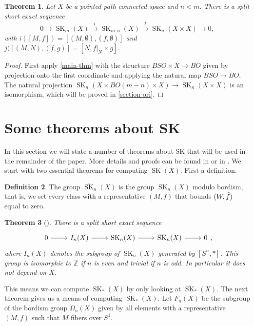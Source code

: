 \documentclass{amsart}
\newtheorem{thm}{Theorem}[section]
\theoremstyle{definition}
\newtheorem{defi}[thm]{Definition}
\theoremstyle{remark}
\newcommand{\Z}{\mathbb{Z}}
\newcommand{\SK}{\operatorname{SK}}
\newcommand{\bSK}{\overline{\SK}}
\begin{document}
\begin{thm}
    \label{komiya-ori}
    Let $X$ be a pointed path connected space and $n<m$. There is a split short exact sequence
    \[0 \longrightarrow \SK_m(X) \xrightarrow{i} \SK_{m,n}(X) \xrightarrow{j}  \SK_n(X\times X) \longrightarrow 0,\]
    with $i([M,f]) = [(M,\emptyset), (f, \emptyset)]$ and $j([(M,N), (f,g)] = [N, f|_N\times g]$.
\end{thm}
\begin{proof}
    First apply \cref{main-thm} with the structure $BSO\times X \to BO$ given by projection onto the first coordinate and applying the natural map $BSO\to BO$. The natural projection $\SK_n(X\times BO(m-n) \times X) \to \SK_n(X\times X)$ is an isomorphism, which will be proved in \cref{section-ori}.
\end{proof}

\section{Some theorems about SK}

In this section we will state a number of theorems about SK that will be used in the remainder of the paper. More details and proofs can be found in \cite{skbook} or in \cite{neumann1975}. We start with two essential theorems for computing $\SK(X)$. First a definition.

\begin{defi}
    The group $\bSK_n(X)$ is the group $\SK_n(X)$ modulo bordism, that is, we set every class with a representative $(M,f)$ that bounds $(W,\Tilde{f})$ equal to zero.
\end{defi}

\begin{thm}[{\cite[Theorem 1.1]{skbook}}]
\label{skbook1.1}
    There is a split short exact sequence
    \[\begin{tikzcd}
    0 \arrow[r] & I_n(X) \arrow[r] & \SK_n(X) \arrow[r] & \bSK_n(X) \arrow[r] & 0
    \end{tikzcd},\]
    where $I_n(X)$ denotes the subgroup of $\SK_n(X)$ generated by $[S^n, *]$. This group is isomorphic to $\Z$ if $n$ is even and trivial if $n$ is odd. In particular it does not depend on $X$.
\end{thm}

This means we can compute $\SK_*(X)$ by only looking at $\bSK_*(X)$. The next theorem gives us a means of computing $\bSK_*(X)$. Let $F_n(X)$ be the subgroup of the bordism group $\Omega_n(X)$ given by all elements with a representative $(M,f)$ such that $M$ fibers over $S^1.$
\end{document}
